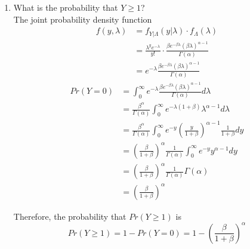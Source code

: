 \documentclass[11pt]{article}
\begin{document}
\begin{enumerate}[label=\textbf{Question \arabic*:},start=1]
\begin{enumerate}
	\item What is the probability that $Y\geq 1$?\\
	
	The joint probability density function
	\begin{align*}
	f(y,\lambda) & = f_{Y|\Lambda}(y|\lambda) \cdot f_{\Lambda}(\lambda) \\
	& = \frac{\lambda^y e^{-\lambda}}{y!} \cdot \frac{\beta e^{-\beta \lambda} (\beta \lambda)^{\alpha-1}}{\Gamma(\alpha)} \\
	& = e^{-\lambda} \frac{\beta e^{-\beta \lambda} (\beta \lambda)^{\alpha-1}}{\Gamma(\alpha)}
	\end{align*}
	\begin{align*}
	Pr(Y=0) & = \int_0^{\infty} e^{-\lambda} \frac{\beta e^{-\beta \lambda} (\beta \lambda)^{\alpha-1}}{\Gamma(\alpha)} d\lambda \\
	& = \frac{\beta^\alpha}{\Gamma(\alpha)} \int_0^{\infty} e^{-\lambda(1+\beta)} \lambda^{\alpha-1} d \lambda \\
	& = \frac{\beta^\alpha}{\Gamma(\alpha)} \int_0^{\infty} e^{-y} (\frac{y}{1+\beta})^{\alpha-1} \frac{1}{1+\beta} dy \\
	& = (\frac{\beta}{1+\beta})^\alpha \frac{1}{\Gamma(\alpha)} \int_0^{\infty} e^{-y} y^{\alpha-1} dy \\
	& = (\frac{\beta}{1+\beta})^\alpha \frac{1}{\Gamma(\alpha)} \Gamma(\alpha) \\
	& = (\frac{\beta}{1+\beta})^\alpha
	\end{align*}
	
	Therefore, the probability that $Pr(Y \geq 1)$ is
	\[
	Pr(Y \geq 1) = 1 - Pr(Y=0) = 1 - (\frac{\beta}{1+\beta})^\alpha
	\]

\end{enumerate}







\end{enumerate}
\end{document}
